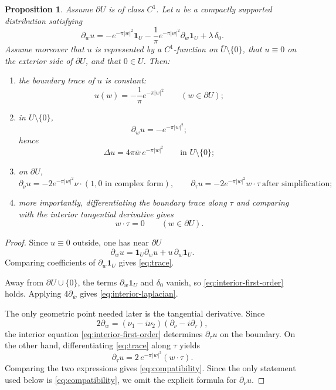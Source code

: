 \documentclass[11pt]{article}
\newtheorem{proposition}[theorem]{Proposition}
\newcommand{\1}{\mathbf 1}
\newcommand{\pw}{\partial_w}
\newcommand{\pwb}{\partial_{\bar w}}
\begin{document}
\begin{proposition}\label{prop:bvp}
Assume \(\partial U\) is of class \(C^1\). Let \(u\) be a compactly supported distribution
satisfying
\[
\pw u
=
-e^{-\pi|w|^2}\1_U
-\frac1\pi e^{-\pi|w|^2}\pw \1_U
+\lambda\,\delta_0.
\]
Assume moreover that \(u\) is represented by a \(C^1\)-function on \(\overline U\setminus\{0\}\),
that \(u\equiv 0\) on the exterior side of \(\partial U\), and that \(0\in U\). Then:
\begin{enumerate}[label=\textnormal{(\roman*)}]
\item the boundary trace of \(u\) is constant:
\begin{equation}\label{eq:trace}
u(w)=-\frac1\pi e^{-\pi|w|^2}
\qquad (w\in \partial U);
\end{equation}
\item in \(U\setminus\{0\}\),
\begin{equation}\label{eq:interior-first-order}
\pw u=-e^{-\pi|w|^2};
\end{equation}
hence
\begin{equation}\label{eq:interior-laplacian}
\Delta u=4\pi \bar w\,e^{-\pi|w|^2}
\qquad \text{in }U\setminus\{0\};
\end{equation}
\item on \(\partial U\),
\begin{equation}\label{eq:normal-tangent}
\partial_\nu u=-2e^{-\pi|w|^2}\nu\cdot(1,0 \text{ in complex form}),
\qquad
\partial_\tau u=-2e^{-\pi|w|^2}w\cdot \tau \ \text{after simplification};
\end{equation}
\item more importantly, differentiating the boundary trace along \(\tau\) and comparing with the
interior tangential derivative gives
\begin{equation}\label{eq:compatibility}
w\cdot \tau=0
\qquad (w\in \partial U).
\end{equation}
\end{enumerate}
\end{proposition}

\begin{proof}
Since \(u\equiv 0\) outside, one has near \(\partial U\)
\[
\pw u=\1_U\pw u+u\,\pw\1_U.
\]
Comparing coefficients of \(\pw\1_U\) gives \eqref{eq:trace}.

Away from \(\partial U\cup\{0\}\), the terms \(\pw\1_U\) and \(\delta_0\) vanish, so
\eqref{eq:interior-first-order} holds. Applying \(4\pwb\) gives \eqref{eq:interior-laplacian}.

The only geometric point needed later is the tangential derivative. Since
\[
2\pw=(\nu_1-i\nu_2)(\partial_\nu-i\partial_\tau),
\]
the interior equation \eqref{eq:interior-first-order} determines \(\partial_\tau u\) on the
boundary. On the other hand, differentiating \eqref{eq:trace} along \(\tau\) yields
\[
\partial_\tau u=2\,e^{-\pi|w|^2}(w\cdot \tau).
\]
Comparing the two expressions gives \eqref{eq:compatibility}. Since the only statement used below
is \eqref{eq:compatibility}, we omit the explicit formula for \(\partial_\nu u\).
\end{proof}
\end{document}

